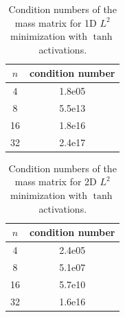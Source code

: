 \documentclass{article}
\theoremstyle{remark}
\begin{document}
\begin{table}[H]
    \centering
    \begin{tabular}{c|c}
        $n$ & condition number \\ \hline \hline 
        4 & 1.8e05\\ \hline 
        8 & 5.5e13 \\ \hline 
        16 & 1.8e16 \\ \hline 
        32 & 2.4e17\\ \hline 
    \end{tabular}
    \caption{Condition numbers of the mass matrix for 1D $L^2$ minimization with $\tanh$ activations.}
    \label{tab:condition-tanh-1d}
\end{table}

\begin{table}[H]
    \centering
    \begin{tabular}{c|c}
        $n$ & condition number \\ \hline \hline 
        4 & 2.4e05\\ \hline 
        8 & 5.1e07 \\ \hline 
        16 & 5.7e10\\ \hline 
        32 & 1.6e16\\ \hline 
    \end{tabular}
    \caption{Condition numbers of the mass matrix for 2D $L^2$ minimization with $\tanh$ activations.}
    \label{tab:condition-tanh-2d}
\end{table}



\end{document}
